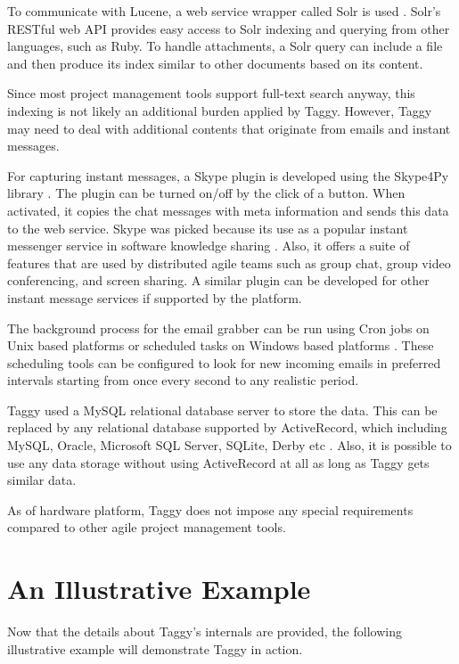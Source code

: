 To communicate with Lucene, a web service wrapper called Solr is used \cite{solr}. Solr's RESTful web API provides easy access to Solr indexing and querying from other languages, such as Ruby. To handle attachments, a Solr query can include a file and then produce its index similar to other documents based on its content.

Since most project management tools support full-text search anyway, this indexing is not likely an additional burden applied by Taggy. However, Taggy may need to deal with additional contents that originate from emails and instant messages.

For capturing instant messages, a Skype plugin is developed using the Skype4Py library \cite{skype4py}. The plugin can be turned on/off by the click of a button. When activated, it copies the chat messages with meta information and sends this data to the web service. Skype was picked because its use as a popular instant messenger service in software knowledge sharing \cite{how_did_we}. Also, it offers a suite of features that are used by distributed agile teams such as group chat, group video conferencing, and screen sharing. A similar plugin can be developed for other instant message services if supported by the platform.

The background process for the email grabber can be run using Cron jobs on Unix based platforms or scheduled tasks on Windows based platforms \cite{cron, scheduled_tasks}. These scheduling tools can be configured to look for new incoming emails in preferred intervals starting from once every second to any realistic period.

Taggy used a MySQL relational database server to store the data. This can be replaced by any relational database supported by ActiveRecord, which including MySQL, Oracle, Microsoft SQL Server, SQLite, Derby etc \cite{active_record}. Also, it is possible to use any data storage without using ActiveRecord at all as long as Taggy gets similar data.

As of hardware platform, Taggy does not impose any special requirements compared to other agile project management tools.

\section{An Illustrative Example}	
Now that the details about Taggy's internals are provided, the following illustrative example will demonstrate Taggy in action.

